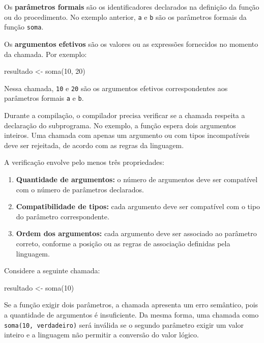 \documentclass[
  brazilian,
  letterpaper,
]{book}
\newenvironment{Shaded}{\begin{snugshade}}{\end{snugshade}}
\newcommand{\DecValTok}[1]{\textcolor[rgb]{0.68,0.00,0.00}{#1}}
\newcommand{\NormalTok}[1]{\textcolor[rgb]{0.00,0.23,0.31}{#1}}
\providecommand{\tightlist}{%
  \setlength{\itemsep}{0pt}\setlength{\parskip}{0pt}}
\theoremstyle{plain}
\theoremstyle{definition}
\theoremstyle{remark}
\begin{document}
Os \textbf{parâmetros formais} são os identificadores declarados na
definição da função ou do procedimento. No exemplo anterior, \texttt{a}
e \texttt{b} são os parâmetros formais da função \texttt{soma}.

Os \textbf{argumentos efetivos} são os valores ou as expressões
fornecidos no momento da chamada. Por exemplo:

\begin{Shaded}
\begin{Highlighting}[]
\NormalTok{resultado \textless{}{-} soma(}\DecValTok{10}\NormalTok{, }\DecValTok{20}\NormalTok{)}
\end{Highlighting}
\end{Shaded}

Nessa chamada, \texttt{10} e \texttt{20} são os argumentos efetivos
correspondentes aos parâmetros formais \texttt{a} e \texttt{b}.

Durante a compilação, o compilador precisa verificar se a chamada
respeita a declaração do subprograma. No exemplo, a função espera dois
argumentos inteiros. Uma chamada com apenas um argumento ou com tipos
incompatíveis deve ser rejeitada, de acordo com as regras da linguagem.

A verificação envolve pelo menos três propriedades:

\begin{enumerate}
\def\labelenumi{\arabic{enumi}.}
\tightlist
\item
  \textbf{Quantidade de argumentos:} o número de argumentos deve ser
  compatível com o número de parâmetros declarados.
\item
  \textbf{Compatibilidade de tipos:} cada argumento deve ser compatível
  com o tipo do parâmetro correspondente.
\item
  \textbf{Ordem dos argumentos:} cada argumento deve ser associado ao
  parâmetro correto, conforme a posição ou as regras de associação
  definidas pela linguagem.
\end{enumerate}

Considere a seguinte chamada:

\begin{Shaded}
\begin{Highlighting}[]
\NormalTok{resultado \textless{}{-} soma(}\DecValTok{10}\NormalTok{)}
\end{Highlighting}
\end{Shaded}

Se a função exigir dois parâmetros, a chamada apresenta um erro
semântico, pois a quantidade de argumentos é insuficiente. Da mesma
forma, uma chamada como \texttt{soma(10,\ verdadeiro)} será inválida se
o segundo parâmetro exigir um valor inteiro e a linguagem não permitir a
conversão do valor lógico.
\end{document}
